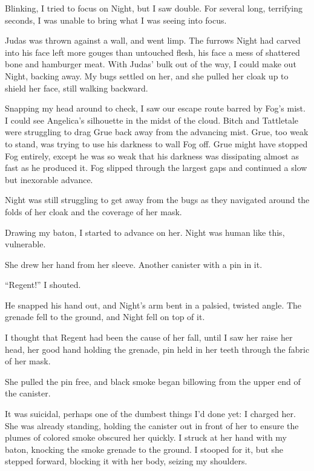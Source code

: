 Blinking, I tried to focus on Night, but I saw double.  For several long, terrifying seconds, I was unable to bring what I was seeing into focus.



Judas was thrown against a wall, and went limp.  The furrows Night had carved into his face left more gouges than untouched flesh, his face a mess of shattered bone and hamburger meat.  With Judas' bulk out of the way, I could make out Night, backing away.  My bugs settled on her, and she pulled her cloak up to shield her face, still walking backward.



Snapping my head around to check, I saw our escape route barred by Fog's mist.  I could see Angelica's silhouette in the midst of the cloud.  Bitch and Tattletale were struggling to drag Grue back away from the advancing mist.  Grue, too weak to stand, was trying to use his darkness to wall Fog off.  Grue might have stopped Fog entirely, except he was so weak that his darkness was dissipating almost as fast as he produced it.  Fog slipped through the largest gaps and continued a slow but inexorable advance.



Night was still struggling to get away from the bugs as they navigated around the folds of her cloak and the coverage of her mask.



Drawing my baton, I started to advance on her.  Night was human like this, vulnerable.



She drew her hand from her sleeve.  Another canister with a pin in it.



``Regent!'' I shouted.



He snapped his hand out, and Night's arm bent in a palsied, twisted angle.  The grenade fell to the ground, and Night fell on top of it.



I thought that Regent had been the cause of her fall, until I saw her raise her head, her good hand holding the grenade, pin held in her teeth through the fabric of her mask.



She pulled the pin free, and black smoke began billowing from the upper end of the canister.



It was suicidal, perhaps one of the dumbest things I'd done yet: I charged her.  She was already standing, holding the canister out in front of her to ensure the plumes of colored smoke obscured her quickly.  I struck at her hand with my baton, knocking the smoke grenade to the ground.  I stooped for it, but she stepped forward, blocking it with her body, seizing my shoulders.



